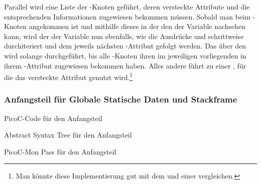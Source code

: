 Parallel wird eine Liste der -Knoten geführt, deren \textcolor{gray!90!black}{versteckte Attribute}  und  die entsprechenden Informationen zugewiesen bekommen müssen. Sobald man beim -Knoten angekommen ist und mithilfe dieses in der  den  der Variable nachsehen kann, wird der  der Variable nun ebenfalls, wie die Ausdrücke  und  schrittweise durchiteriert und dem jeweils nächsten -Attribut gefolgt werden. Das  über den  wird solange durchgeführt, bis alle -Knoten ihren im jeweiligen  vorliegenden  in ihrem -Attribut zugewiesen bekommen haben. Alles andere führt zu einer , für die das \textcolor{gray!90!black}{versteckte Attribut}  genutzt wird.\footnote{Man könnte diese Implementierung gut mit dem  und  einer  vergleichen.}

\subsubsection{Anfangsteil für Globale Statische Daten und Stackframe}
\label{sec:einleitungsteil_für_globale_statische_daten_und_stackframe}

\begin{code}
  \centering
  \caption{PicoC-Code für den Anfangsteil}
  \label{code:picoc_code_einleitungsteil}
\end{code}


\begin{code}
  \centering
  \caption{Abstract Syntax Tree für den Anfangsteil}
  \label{code:abstract_syntax_tree_einleitungsteil}
\end{code}

\begin{code}
  \centering
  \caption{PicoC-Mon Pass für den Anfangsteil}
  \label{code:picoc_mon_pass_einleitungsteil}
\end{code}

